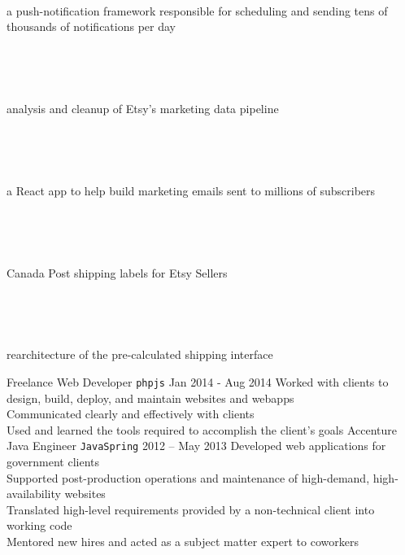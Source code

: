 \documentclass[9pt]{developercv} %
\begin{document}
\begin{entrylist}
{            \begin{minipage}[t]{0.05\textwidth}\,\end{minipage}
            \begin{minipage}[t]{0.8\textwidth}a push-notification framework responsible for scheduling and sending tens of thousands of notifications per day\end{minipage}\\
            \begin{minipage}[t]{0.05\textwidth}\,\end{minipage}
            \begin{minipage}[t]{0.8\textwidth}analysis and cleanup of Etsy’s marketing data pipeline\end{minipage}\\
            \begin{minipage}[t]{0.05\textwidth}\,\end{minipage}
            \begin{minipage}[t]{0.8\textwidth}a React app to help build marketing emails sent to millions of subscribers\end{minipage}\\
            \begin{minipage}[t]{0.05\textwidth}\,\end{minipage}
            \begin{minipage}[t]{0.8\textwidth}Canada Post shipping labels for Etsy Sellers\end{minipage}\\
            \begin{minipage}[t]{0.05\textwidth}\,\end{minipage}
            \begin{minipage}[t]{0.8\textwidth}rearchitecture of the pre-calculated shipping interface\end{minipage}
        }
    \entry
        {Freelance}
        {Web Developer \hspace{1mm}\texttt{php}\slashsep\texttt{js}}
        {Jan 2014 - Aug 2014}
        {
            Worked with clients to design, build, deploy, and maintain websites and webapps\\
            Communicated clearly and effectively with clients\\
            Used and learned the tools required to accomplish the client’s goals
        }
    \entry
        {Accenture}
        {Java Engineer \hspace{1mm}\texttt{Java}\slashsep\texttt{Spring}}
        {2012 -- May 2013}
        {
            Developed web applications for government clients\\
            Supported post-production operations and maintenance of high-demand, high-availability websites\\
            Translated high-level requirements provided by a non-technical client into working code\\
            Mentored new hires and acted as a subject matter expert to coworkers
        }
\end{entrylist}
\end{document}
